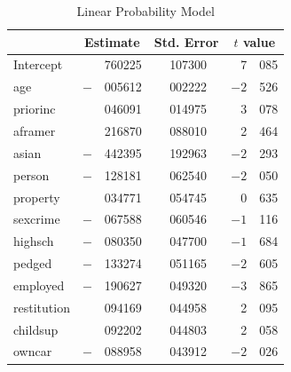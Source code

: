 \begin{table}[t]
\begin{center}
\caption{Linear Probability Model}
\vspace{0.1cm}
\begin{tabular}{lr@{.}lr@{.}lr@{.}l}
  \hline
   & \multicolumn{2}{c}{Estimate} & \multicolumn{2}{c}{Std. Error} & \multicolumn{2}{c}{$t$ value} \\ \hline
  Intercept \hspace{0.5cm}  & \hspace{0.3cm}  & 760225  & \hspace{0.3cm} & 107300   &  7 & 085 \\
  age	      & $-$ & 005612	&  & 002222 & $-2$ & 526 \\
  priorinc    &     & 046091	&  & 014975 &	3  & 078 \\
  aframer	  &     & 216870	&  & 088010 &	2  & 464 \\
  asian	      & $-$ & 442395	&  & 192963 & $-2$ & 293 \\
  person	  & $-$ & 128181	&  & 062540 & $-2$ & 050 \\
  property    &     & 034771	&  & 054745 &	0  & 635 \\
  sexcrime	  & $-$ & 067588	&  & 060546 & $-1$ & 116 \\
  highsch	  & $-$ & 080350    &  & 047700 & $-1$ & 684 \\
  pedged	  & $-$ & 133274	&  & 051165 & $-2$ & 605 \\
  employed	  & $-$ & 190627	&  & 049320 & $-3$ & 865 \\
  restitution &	    & 094169	&  & 044958 &	2  & 095 \\
  childsup	  &     & 092202	&  & 044803 &	2  & 058 \\
  owncar	  & $-$ & 088958	&  & 043912 & $-2$ & 026 \\
  \hline
\end{tabular}
\normalsize
\end{center}
\end{table}

